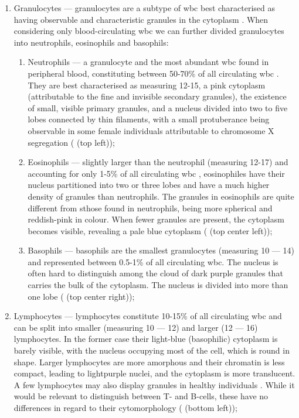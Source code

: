 \begin{enumerate}
    \item{Granulocytes} --- granulocytes are a subtype of \ac{wbc} best characterised as having observable and characteristic granules in the cytoplasm \cite{Web2009-xt}. When considering only blood-circulating \ac{wbc} we can further divided granulocytes into neutrophils, eosinophils and basophils:
    \begin{enumerate}
        \item{Neutrophils} --- a granulocyte and the most abundant \ac{wbc} found in peripheral blood, constituting between 50-70\% of all circulating \ac{wbc} \cite{Actor2012-wq}. They are best characterised as measuring 12-15\Mum, a pink cytoplasm (attributable to the fine and invisible secondary granules), the existence of small, visible primary granules, and a nucleus divided into two to five lobes connected by thin filaments, with a small protuberance being observable in some female individuals attributable to chromosome X segregation \cite{Bain2014-oc} ( (top left));
        \item{Eosinophils} --- slightly larger than the neutrophil (measuring 12-17\Mum) and accounting for only 1-5\% of all circulating \ac{wbc} \cite{Simon2007-un}, eosinophiles have their nucleus partitioned into two or three lobes and have a much higher density of granules than neutrophils. The granules in eosinophils are quite different from sthose found in neutrophils, being more spherical and reddish-pink in colour. When fewer granules are present, the cytoplasm becomes visible, revealing a pale blue cytoplasm \cite{Bain2014-oc} ( (top center left));
        \item{Basophils} --- basophils are the smallest granulocytes (measuring 10 --- 14\Mum) and represented between 0.5-1\% of all circulating \ac{wbc}. The nucleus is often hard to distinguish among the cloud of dark purple granules that carries the bulk of the cytoplasm. The nucleus is divided into more than one lobe \cite{Bain2014-oc} ( (top center right));
    \end{enumerate}
    \item{Lymphocytes} --- lymphocytes constitute 10-15\% of all circulating \ac{wbc} and can be split into smaller (measuring 10 --- 12\Mum) and larger (12 --- 16\Mum) lymphocytes. In the former case their light-blue (basophilic) cytoplasm is barely visible, with the nucleus occupying most of the cell, which is round in shape. Larger lymphocytes are more amorphous and their chromatin is less compact, leading to lightpurple nuclei, and the cytoplasm is more translucent. A few lymphocytes may also display granules in healthy individuals \cite{Bain2014-oc}. While it would be relevant to distinguish between T- and B-cells, these have no differences in regard to their cytomorphology \cite{Cano2013-gu} ( (bottom left));

\end{enumerate}
